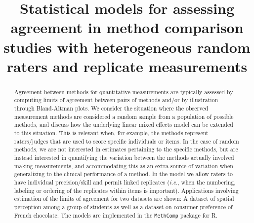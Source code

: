 \documentclass[aoas]{imsart}
\makeatletter
\newcommand{\R}{\textsf{R}\@\xspace}
\newcommand{\pkg}[1]{\texttt{#1}\@\xspace}
\newcommand{\ie}{\emph{i.e.}\@\xspace}
\makeatother
\begin{document}
\begin{frontmatter}

\title{Statistical models for assessing
  agreement in method comparison studies with 
  heterogeneous random raters and replicate measurements}



\begin{abstract}
    Agreement between methods for quantitative measurements are
  typically assessed by computing limits of agreement between pairs of
  methods and/or by illustration through Bland-Altman plots. We
  consider the situation where the observed measurement methods are
  considered a random sample from a population of possible methods,
  and discuss how the underlying linear mixed effects model can be
  extended to this situation. This is relevant when, for example, the
  methods represent raters/judges that are used to score specific
  individuals or items. In the case of random methods, we are not
  interested in estimates pertaining to the specific methods, but are
  instead interested in quantifying the variation between the methods
  actually involved making measurements, and accommodating this as an
  extra source of variation when generalizing to the clinical
  performance of a method. In the model we allow raters to have
  individual precision/skill and permit linked replicates (\ie, when
  the numbering, labeling or ordering of the replicates within items
  is important). Applications involving estimation of the limits of
  agreement for two datasets are shown: A dataset of spatial
  perception among a group of students as well as a dataset on
  consumer preference of French chocolate. The models are implemented
  in the \pkg{MethComp} package for \R.
\end{abstract}


\end{frontmatter}
\end{document}
